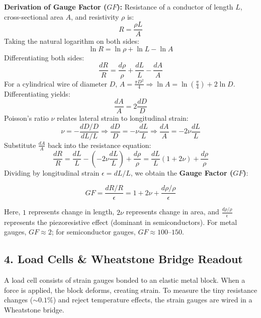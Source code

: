 \documentclass[12pt,a4paper]{article}
\begin{document}
\textbf{Derivation of Gauge Factor ($GF$):}
Resistance of a conductor of length $L$, cross-sectional area $A$, and resistivity $\rho$ is:
\[
R = \frac{\rho L}{A}
\]
Taking the natural logarithm on both sides:
\[
\ln R = \ln \rho + \ln L - \ln A
\]
Differentiating both sides:
\[
\frac{dR}{R} = \frac{d\rho}{\rho} + \frac{dL}{L} - \frac{dA}{A}
\]
For a cylindrical wire of diameter $D$, $A = \frac{\pi D^2}{4} \Rightarrow \ln A = \ln\left(\frac{\pi}{4}\right) + 2\ln D$. Differentiating yields:
\[
\frac{dA}{A} = 2 \frac{dD}{D}
\]
Poisson's ratio $\nu$ relates lateral strain to longitudinal strain:
\[
\nu = -\frac{dD/D}{dL/L} \Rightarrow \frac{dD}{D} = -\nu \frac{dL}{L} \Rightarrow \frac{dA}{A} = -2\nu \frac{dL}{L}
\]
Substitute $\frac{dA}{A}$ back into the resistance equation:
\[
\frac{dR}{R} = \frac{dL}{L} - \left(-2\nu \frac{dL}{L}\right) + \frac{d\rho}{\rho} = \frac{dL}{L}(1 + 2\nu) + \frac{d\rho}{\rho}
\]
Dividing by longitudinal strain $\epsilon = dL/L$, we obtain the \textbf{Gauge Factor ($GF$)}:
\begin{tcolorbox}[formulabox, title={\textbf{Gauge Factor Equation}}]
\[
GF = \frac{dR/R}{\epsilon} = 1 + 2\nu + \frac{d\rho/\rho}{\epsilon}
\]
\end{tcolorbox}
Here, $1$ represents change in length, $2\nu$ represents change in area, and $\frac{d\rho/\rho}{\epsilon}$ represents the piezoresistive effect (dominant in semiconductors). For metal gauges, $GF \approx 2$; for semiconductor gauges, $GF \approx 100\text{--}150$.

\subsection{4. Load Cells \& Wheatstone Bridge Readout}
A load cell consists of strain gauges bonded to an elastic metal block. When a force is applied, the block deforms, creating strain. To measure the tiny resistance changes ($\sim 0.1\%$) and reject temperature effects, the strain gauges are wired in a Wheatstone bridge.

\begin{tcolorbox}[tikzbox, title={Wheatstone Bridge Strain Gauge Readout Circuit}]
\centering
{}
\end{tcolorbox}
\end{document}
